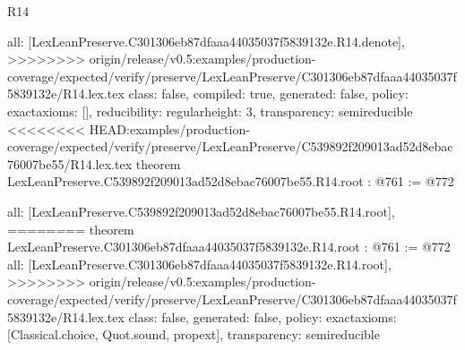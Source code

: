 \begin{lexlean}{R14}
\begin{coremodule}
{{{{{{{{{{{{  all: [LexLeanPreserve.C301306eb87dfaaa44035037f5839132e.R14.denote],
>>>>>>>> origin/release/v0.5:examples/production-coverage/expected/verify/preserve/LexLeanPreserve/C301306eb87dfaaa44035037f5839132e/R14.lex.tex
  class: false,
  compiled: true,
  generated: false,
  policy: exact{axioms: []},
  reducibility: regular{height: 3},
  transparency: semireducible
}
<<<<<<<< HEAD:examples/production-coverage/expected/verify/preserve/LexLeanPreserve/C539892f209013ad52d8ebac76007be55/R14.lex.tex
theorem LexLeanPreserve.C539892f209013ad52d8ebac76007be55.R14.root : @761 := @772 {
  all: [LexLeanPreserve.C539892f209013ad52d8ebac76007be55.R14.root],
========
theorem LexLeanPreserve.C301306eb87dfaaa44035037f5839132e.R14.root : @761 := @772 {
  all: [LexLeanPreserve.C301306eb87dfaaa44035037f5839132e.R14.root],
>>>>>>>> origin/release/v0.5:examples/production-coverage/expected/verify/preserve/LexLeanPreserve/C301306eb87dfaaa44035037f5839132e/R14.lex.tex
  class: false,
  generated: false,
  policy: exact{axioms: [Classical.choice, Quot.sound, propext]},
  transparency: semireducible
}

}}}}}}}}}}}}
\end{coremodule}
\end{lexlean}
